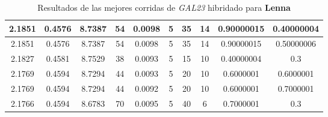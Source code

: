 \begin{table}[h!]
\begin{center}
\begin{tabular}{|c|c|c|c|c|c|c|c|c|c|}
        \hline
        \hline
            2.1851 & 0.4576  & 8.7387 & 54 & 0.0098 & 5 & 35 & 14 & 0.90000015 & 0.40000004\\
        \hline
        \hline
            2.1851 & 0.4576  & 8.7387 & 54 & 0.0098 & 5 & 35 & 14 & 0.90000015 & 0.50000006\\
        \hline
        \hline
            2.1827 & 0.4581  & 8.7529 & 38 & 0.0093 & 5 & 15 & 10 & 0.40000004 & 0.3\\
        \hline
        \hline
            2.1769 & 0.4594  & 8.7294 & 44 & 0.0093 & 5 & 20 & 10 & 0.6000001 & 0.6000001\\
        \hline
        \hline
            2.1769 & 0.4594  & 8.7294 & 44 & 0.0092 & 5 & 20 & 10 & 0.6000001 & 0.7000001\\
        \hline
        \hline
            2.1766 & 0.4594  & 8.6783 & 70 & 0.0095 & 5 & 40 & 6 & 0.7000001 & 0.3\\
        \hline
        \end{tabular}
        \caption{Resultados de las mejores corridas de \emph{GAL23} hibridado para {\bf Lenna}}
        \label{tb:tableGAL23}
    \end{center}
\end{table}
